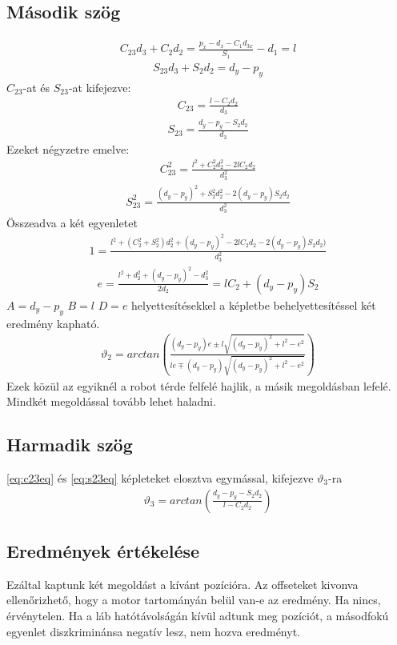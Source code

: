 \documentclass{article}
\begin{document}
\subsection{Második szög}
\begin{align*}
C_{23} d_3+C_2 d_2=\frac{p_x-d_x-C_1 d_{3x}}{S_1} -d_1=l
\end{align*}
\begin{align*}
S_{23} d_3+S_2 d_2=d_y-p_y
\end{align*}
$C_{23}$-at és $S_{23}$-at kifejezve:
\begin{align}\label{eq:c23eq}
C_{23}=\frac{l-C_2 d_2}{d_3}
\end{align}
\begin{align}\label{eq:s23eq}
S_{23}=\frac{d_y-p_y-S_2 d_2}{d_3} 
\end{align}
Ezeket négyzetre emelve:
\begin{align*}
C_{23}^2=\frac{l^2+C_2^2 d_2^2-2lC_2 d_2}{d_3^2}
\end{align*}
\begin{align*}
S_{23}^2=\frac{\left(d_y-p_y\right)^2+S_2^2d_2^2-2\left(d_y-p_y\right)S_2d_2}{d_3^2}
\end{align*}
Összeadva a két egyenletet
\begin{align*}
1=\frac{l^2+(C_2^2+S_2^2)d_2^2+\left(d_y-p_y\right)^2-2lC_2 d_2-2\left(d_y-p_y\right)S_2 d_2)}{d_3^2}
\end{align*}
\begin{align*}
e=\frac{l^2+d_2^2+\left(d_y-p_y\right)^2-d_3^2}{2d_2}=lC_2+\left(d_y-p_y\right)S_2
\end{align*}
$A=d_y-p_y$ $B=l$ $D=e$ helyettesítésekkel a képletbe behelyettesítéssel két eredmény kapható.
\begin{align}
\vartheta_2 = arctan \left( \frac{(d_y-p_y) e\pm l\sqrt{(d_y-p_y)^2+l^2-e^2}}{l e\mp (d_y-p_y)\sqrt{(d_y-p_y)^2+l^2-e^2}} \right)
\end{align}
Ezek közül az egyiknél a robot térde felfelé hajlik, a másik megoldásban lefelé. Mindkét megoldással tovább lehet haladni.
\subsection{Harmadik szög}
\eqref{eq:c23eq} és \eqref{eq:s23eq} képleteket elosztva egymással, kifejezve $\vartheta_3$-ra
\begin{align}
\vartheta_3=arctan\left(\frac{d_y-p_y-S_2 d_2}{l-C_2 d_2}\right)
\end{align}
\subsection{Eredmények értékelése}
Ezáltal kaptunk két megoldást a kívánt pozícióra. Az offseteket kivonva ellenőrizhető, hogy a motor tartományán belül van-e az eredmény. Ha nincs, érvénytelen. Ha a láb hatótávolságán kívül adtunk meg pozíciót, a másodfokú egyenlet diszkriminánsa negatív lesz, nem hozva eredményt.
\end{document}
